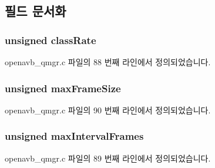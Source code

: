 \subsection{필드 문서화}
\subsubsection[{\texorpdfstring{class\+Rate}{classRate}}]{\setlength{\rightskip}{0pt plus 5cm}unsigned class\+Rate}\hypertarget{structqmgr_stream__t_af50080087f14150fb5d5fdc484ca79f5}{}\label{structqmgr_stream__t_af50080087f14150fb5d5fdc484ca79f5}


openavb\+\_\+qmgr.\+c 파일의 88 번째 라인에서 정의되었습니다.

\subsubsection[{\texorpdfstring{max\+Frame\+Size}{maxFrameSize}}]{\setlength{\rightskip}{0pt plus 5cm}unsigned max\+Frame\+Size}\hypertarget{structqmgr_stream__t_ab3d51dcd6637a6348d70a58a420d7d82}{}\label{structqmgr_stream__t_ab3d51dcd6637a6348d70a58a420d7d82}


openavb\+\_\+qmgr.\+c 파일의 90 번째 라인에서 정의되었습니다.

\subsubsection[{\texorpdfstring{max\+Interval\+Frames}{maxIntervalFrames}}]{\setlength{\rightskip}{0pt plus 5cm}unsigned max\+Interval\+Frames}\hypertarget{structqmgr_stream__t_aa49daeac307e6a8205c5d418a78d84d6}{}\label{structqmgr_stream__t_aa49daeac307e6a8205c5d418a78d84d6}


openavb\+\_\+qmgr.\+c 파일의 89 번째 라인에서 정의되었습니다.

